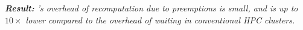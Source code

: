 \noindent \emph{\textbf{Result:} \sysname's overhead of recomputation due to preemptions is small, and is up to $10\times$ lower compared to the overhead of waiting in conventional HPC clusters. }

